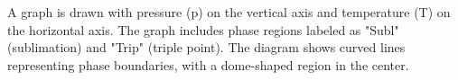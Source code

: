 A graph is drawn with pressure (p) on the vertical axis and temperature (T) on the horizontal axis. The graph includes phase regions labeled as "Subl" (sublimation) and "Trip" (triple point). The diagram shows curved lines representing phase boundaries, with a dome-shaped region in the center.